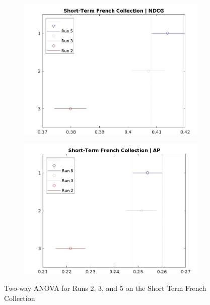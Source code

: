 \begin{figure}[!h]
    \centering
    \begin{subfigure}[b]{0.49\textwidth}
        \centering
        \includegraphics[width=\textwidth]{figure/StatisticalAnalysis/ANOVA 2/ndcg-st-fr.jpeg}
        \label{fig:st_anova_french_ndcg}        
    \end{subfigure}
    \hfill
    \begin{subfigure}[b]{0.49\textwidth}
        \centering
        \includegraphics[width=\textwidth]{figure/StatisticalAnalysis/ANOVA 2/ap-st-fr.jpeg}
        \label{fig:st_anova_french_ap}
    \end{subfigure}
    \caption{Two-way \ac{ANOVA} for Runs 2, 3, and 5 on the Short Term French Collection}
    \label{fig:st_anova_french}
\end{figure}

